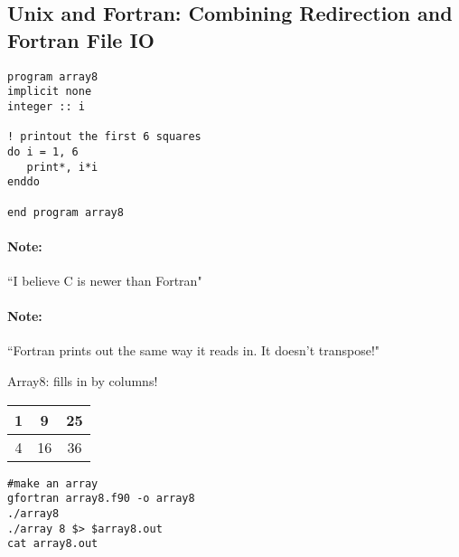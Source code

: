 \documentclass[11pt]{article}
\begin{document}
\subsection{Unix and Fortran: Combining Redirection and Fortran File IO}

\noindent
\begin{minipage}[t]{0.45\textwidth}
\begin{lstlisting}
program array8
implicit none
integer :: i

! printout the first 6 squares
do i = 1, 6
   print*, i*i
enddo

end program array8
\end{lstlisting}
	\end{minipage}
\hfill
\begin{minipage}[t]{0.45\textwidth}

\paragraph{Note:}``I believe C is newer than Fortran"\\

\paragraph{Note:} ``Fortran prints out the same way it reads in. It doesn't transpose!"\\
\par Array8: fills in by columns!
\begin{center}
\begin{tabular}{ |c|c|c| }
	\hline
	1 & 9 & 25\\
	\hline
	4 & 16 & 36\\
	\hline
\end{tabular}
\end{center}


\end{minipage}

\begin{verbatim}
#make an array
gfortran array8.f90 -o array8
./array8
./array 8 $> $array8.out
cat array8.out
\end{verbatim}
\end{document}
